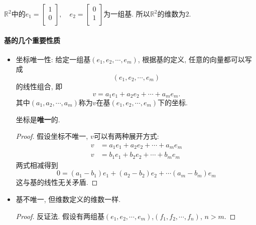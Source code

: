 \begin{example}
    $\mathbb{R}^{2}$中的$e_1 = \begin{bmatrix}
     1\\
     0\\
    \end{bmatrix}, \quad e_2 = \begin{bmatrix}
     0\\
     1\\
    \end{bmatrix}$为一组基. 所以$\mathbb{R}^{2}$的维数为$2$.
\end{example}

\paragraph{基的几个重要性质}
\begin{itemize}
  \item 坐标唯一性: 给定一组基$(e_1,e_2,\cdots , e_m)$, 根据基的定义, 任意的向量都可以写成$$(e_1,e_2,\cdots , e_m)$$的线性组合, 即
  \begin{equation}
    v = a_1e_1+a_2e_2+ \cdots +a_m e_m.
  \end{equation}
  其中$(a_1,a_2,\cdots ,a_m)$称为$v$在基$(e_1,e_2,\cdots, e_m)$下的坐标.
  
  坐标是\textbf{唯一}的.
  \begin{proof}
      假设坐标不唯一, $v$可以有两种展开方式:
      \begin{equation}
        \begin{aligned}
          v & = a_1 e_1+a_2e_2+ \cdots +a_m e_m 
          \\
          v & = b_1 e_1+b_2e_2+ \cdots +b_m e_m 
        \end{aligned}
      \end{equation}
      两式相减得到
      \begin{equation}
        0 = (a_1-b_1)e_1+(a_2-b_2)e_2+ \cdots (a_m - b_m)e_m
      \end{equation}
      这与基的线性无关矛盾.
  \end{proof}

  \item 基不唯一, 但维数定义的维数一样.
  \begin{proof}
      反证法. 假设有两组基$(e_1,e_2,\cdots,e_m)$,$(f_1,f_2,\cdots,f_n)$, $n>m$.
       

\end{proof}
\end{itemize}
